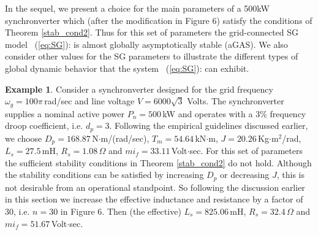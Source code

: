 \documentclass[12pt]{article}
\theoremstyle{definition}
\newtheorem{example}[theorem]{Example}
\numberwithin{equation}{section}                        %
\newcommand{\rfb}[1]{\mbox{\rm
   (\ref{#1})}\ifx\undefined\stillediting\else:\fbox{$#1$}\fi}
\newcommand{\Nscr} {{\cal N}}
\renewcommand{\o}    {{\omega}}
\newcommand{\Om}     {{\Omega}}
\let\oldlabel=\label
\renewcommand{\label}[1]{\leavevmode\smash{\raise 10pt\llap
             {\fbox{\scriptsize#1}}}\oldlabel{#1}}
\renewcommand{\label}[1]{\oldlabel{#1}}
\begin{document}
In the sequel, we present a choice for the main parameters of a 500kW
synchronverter which (after the modification in Figure 6) satisfy the
conditions of Theorem \ref{stab_cond2}. Thus for this set of
parameters the grid-connected SG model \rfb{eq:SG} is almost globally
asymptotically stable (aGAS). We also consider other values for the SG
parameters to illustrate the different types of global dynamic behavior
that the system \rfb{eq:SG} can exhibit.

\begin{example} \label{500kW}
Consider a synchronverter designed for the grid frequency
$\o_g=100\pi\,$rad/sec and line voltage $V=6000\sqrt{3}$ Volts. The
synchronverter supplies a nominal active power $P_n=500\,$kW and
operates with a $3\%$ frequency droop coefficient, i.e. $d_p=3$.
Following the empirical guidelines discussed earlier, we choose
$D_p=168.87\,$N$\cdot$m/(rad/sec), $T_m=54.64\,$kN$\cdot$m,
$J=20.26\,$Kg$\cdot$m$^2$/rad, $L_s=27.5\,$mH, $R_s=1.08\,\Om$ and
$mi_f=33.11\,$Volt$\cdot$sec. For this set of parameters the sufficient
stability conditions in Theorem \ref{stab_cond2} do not hold. Although
the stability conditions can be satisfied by increasing $D_p$ or
decreasing $J$, this is not desirable from an operational
standpoint. So following the discussion earlier in this section we
increase the effective inductance and resistance by a factor of $30$,
i.e. $n=30$ in Figure 6. Then (the effective) $L_s=825.06\,$mH,
$R_s=32.4\,\Om$ and $mi_f=51.67\,$Volt$\cdot$sec.




\end{example}
\end{document}
